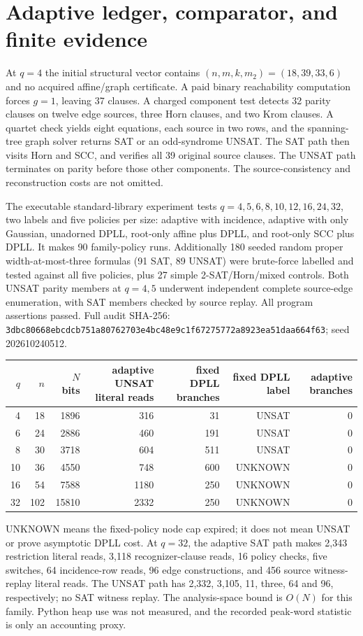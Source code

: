 \documentclass[11pt]{article}
\begin{document}
\section{Adaptive ledger, comparator, and finite evidence}
At $q=4$ the initial structural vector contains $(n,m,k,m_2)=(18,39,33,6)$ and no acquired affine/graph certificate. A paid binary reachability computation forces $g=1$, leaving 37 clauses. A charged component test detects 32 parity clauses on twelve edge sources, three Horn clauses, and two Krom clauses. A quartet check yields eight equations, each source in two rows, and the spanning-tree graph solver returns SAT or an odd-syndrome UNSAT. The SAT path then visits Horn and SCC, and verifies all 39 original source clauses. The UNSAT path terminates on parity before those other components. The source-consistency and reconstruction costs are not omitted.

The executable standard-library experiment tests $q=4,5,6,8,10,12,16,24,32$, two labels and five policies per size: adaptive with incidence, adaptive with only Gaussian, unadorned DPLL, root-only affine plus DPLL, and root-only SCC plus DPLL. It makes 90 family-policy runs. Additionally 180 seeded random proper width-at-most-three formulas (91 SAT, 89 UNSAT) were brute-force labelled and tested against all five policies, plus 27 simple 2-SAT/Horn/mixed controls. Both UNSAT parity members at $q=4,5$ underwent independent complete source-edge enumeration, with SAT members checked by source replay. All program assertions passed. Full audit SHA-256: \texttt{3dbc80668ebcdcb751a80762703e4bc48e9c1f67275772a8923ea51daa664f63}; seed 202610240512.

\begin{center}\small\begin{tabular}{rrrrrrr}\toprule
$q$&$n$&$N$ bits&adaptive UNSAT literal reads&fixed DPLL branches&fixed DPLL label&adaptive branches\\\midrule
4&18&1896&316&31&UNSAT&0\\
6&24&2886&460&191&UNSAT&0\\
8&30&3718&604&511&UNSAT&0\\
10&36&4550&748&600&UNKNOWN&0\\
16&54&7588&1180&250&UNKNOWN&0\\
32&102&15810&2332&250&UNKNOWN&0\\\bottomrule
\end{tabular}\end{center}
UNKNOWN means the fixed-policy node cap expired; it does not mean UNSAT or prove asymptotic DPLL cost. At $q=32$, the adaptive SAT path makes 2,343 restriction literal reads, 3,118 recognizer-clause reads, 16 policy checks, five switches, 64 incidence-row reads, 96 edge constructions, and 456 source witness-replay literal reads. The UNSAT path has 2,332, 3,105, 11, three, 64 and 96, respectively; no SAT witness replay. The analysis-space bound is $O(N)$ for this family. Python heap use was not measured, and the recorded peak-word statistic is only an accounting proxy.
\end{document}
